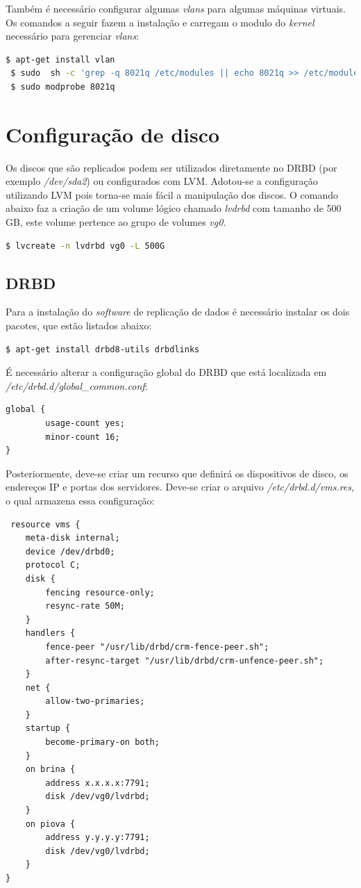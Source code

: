 Também é necessário configurar algumas \textit{vlans} para algumas máquinas virtuais. Os comandos a seguir fazem a instalação e carregam
o modulo do \textit{kernel} necessário para gerenciar \textit{vlans}:
\begin{lstlisting}[language=bash]
 $ apt-get install vlan
 $ sudo  sh -c 'grep -q 8021q /etc/modules || echo 8021q >> /etc/modules'
 $ sudo modprobe 8021q
\end{lstlisting}

\section{Configuração de disco}

Os discos que são replicados podem ser utilizados diretamente no \ac{DRBD} (por exemplo \textit{/dev/sda2}) ou configurados com \ac{LVM}. Adotou-se
a configuração utilizando \ac{LVM} pois torna-se mais fácil a manipulação dos discos. O comando abaixo faz a criação de um volume lógico chamado 
\textit{lvdrbd} com tamanho de 500 GB, este volume pertence ao grupo de volumes \textit{vg0}.
\begin{lstlisting}[language=bash]
 $ lvcreate -n lvdrbd vg0 -L 500G
\end{lstlisting}

\subsection{DRBD}

Para a instalação do \textit{software} de replicação de dados é necessário instalar os dois pacotes, que estão listados abaixo:
\begin{lstlisting}[language=bash]
 $ apt-get install drbd8-utils drbdlinks
\end{lstlisting}

É necessário alterar a configuração global do \ac{DRBD} que está localizada em \textit{/etc/drbd.d/global\_common.conf}:
\begin{lstlisting}
global {
        usage-count yes;
        minor-count 16;
}
\end{lstlisting}

Posteriormente, deve-se criar um recurso que definirá os dispositivos de disco, os endereços \ac{IP} e portas dos servidores.
Deve-se criar o arquivo \textit{/etc/drbd.d/vms.res}, o qual armazena essa configuração:
\begin{lstlisting}
 resource vms {
    meta-disk internal;
    device /dev/drbd0;
    protocol C;
    disk {
        fencing resource-only;
        resync-rate 50M;
    }
    handlers {
        fence-peer "/usr/lib/drbd/crm-fence-peer.sh";
        after-resync-target "/usr/lib/drbd/crm-unfence-peer.sh";
    }
    net {
        allow-two-primaries;
    }
    startup {
        become-primary-on both;
    }
    on brina {
        address x.x.x.x:7791;
        disk /dev/vg0/lvdrbd;
    }
    on piova {
        address y.y.y.y:7791;
        disk /dev/vg0/lvdrbd;
    }
}
\end{lstlisting}

